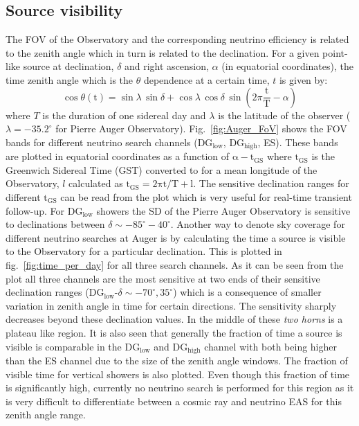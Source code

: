 \subsection{Source visibility}
\label{subsec:psource_coverage}
The \gls{FOV} of the Observatory and the corresponding neutrino efficiency is related to the zenith angle which in turn is related to the declination. For a given point-like source at declination, $\delta$ and right ascension, $\alpha$ (in equatorial coordinates), the time zenith angle which is the $\theta$ dependence at a certain time, $t$ is given by:
\begin{equation}
  \label{eq:zenith_angle_time}
  \cos \theta(\text{t}) = \sin \lambda \,\sin \delta+ \cos \lambda \, \cos \delta \,\sin (2\pi \frac{\text{t}}{\text{T}} - \alpha)
\end{equation} 
where $T$ is the duration of one sidereal day and $\lambda$ is the latitude of the observer ($\lambda = -35.2^{\circ}$ for Pierre Auger Observatory). 
Fig.~\ref{fig:Auger_FoV} shows the FOV bands for different neutrino search channels (DG$\mathrm{_{\text{low}}}$, DG$\mathrm{_{\text{high}}}$, ES). These bands are plotted in equatorial coordinates as a function of $\mathrm{\alpha - t _{GS}}$ where $\mathrm{t_{GS}}$ is the Greenwich Sidereal Time (GST) converted to for a mean longitude of the Observatory, $l$ calculated as $\mathrm{t_{GS}= 2\pi t/T + l}$. The sensitive declination ranges for different $\mathrm{t_{GS}}$ can be read from the plot which is very useful for real-time transient follow-up. For DG$\mathrm{_{\text{low}}}$ showers the SD of the Pierre Auger Observatory is sensitive to declinations between $\delta \sim -85^{\circ} - 40^{\circ}$. Another way to denote sky coverage for different neutrino searches at Auger is by calculating the time a source is visible to the Observatory for a particular declination. This is plotted in fig.~\ref{fig:time_per_day} for all three search channels. As it can be seen from the plot all three channels are the most sensitive at two ends of their sensitive declination ranges (DG$\mathrm{_{\text{low}}}$-$\delta \sim -70^{\circ}, 35^{\circ}$) which is a consequence of smaller variation in zenith angle in time for certain directions. The sensitivity sharply decreases beyond these declination values. In the middle of these \textit{two horns} is a plateau like region. It is also seen that generally the fraction of time a source is visible is comparable in the DG$\mathrm{_{\text{low}}}$ and DG$\mathrm{_{\text{high}}}$ channel with both being higher than the ES channel due to the size of the zenith angle windows. The fraction of visible time for vertical showers is also plotted. Even though this fraction of time is significantly high, currently no neutrino search is performed for this region as it is very difficult to differentiate between a cosmic ray and neutrino EAS for this zenith angle range.

